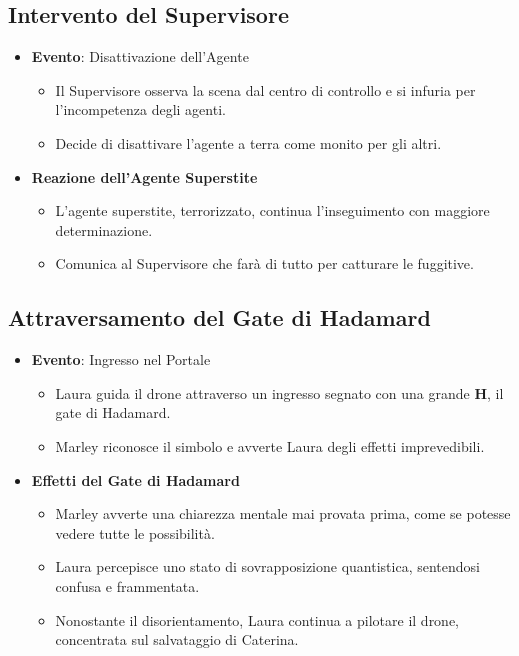 \subsection*{Intervento del Supervisore}

\begin{itemize}
    \item \textbf{Evento}: Disattivazione dell'Agente
    \begin{itemize}
        \item Il Supervisore osserva la scena dal centro di controllo e si infuria per l'incompetenza degli agenti.
        \item Decide di disattivare l'agente a terra come monito per gli altri.
    \end{itemize}

    \item \textbf{Reazione dell'Agente Superstite}
    \begin{itemize}
        \item L'agente superstite, terrorizzato, continua l'inseguimento con maggiore determinazione.
        \item Comunica al Supervisore che farà di tutto per catturare le fuggitive.
    \end{itemize}
\end{itemize}

\subsection*{Attraversamento del Gate di Hadamard}

\begin{itemize}
    \item \textbf{Evento}: Ingresso nel Portale
    \begin{itemize}
        \item Laura guida il drone attraverso un ingresso segnato con una grande \textbf{H}, il gate di Hadamard.
        \item Marley riconosce il simbolo e avverte Laura degli effetti imprevedibili.
    \end{itemize}

    \item \textbf{Effetti del Gate di Hadamard}
    \begin{itemize}
        \item Marley avverte una chiarezza mentale mai provata prima, come se potesse vedere tutte le possibilità.
        \item Laura percepisce uno stato di sovrapposizione quantistica, sentendosi confusa e frammentata.
        \item Nonostante il disorientamento, Laura continua a pilotare il drone, concentrata sul salvataggio di Caterina.
    \end{itemize}
\end{itemize}

